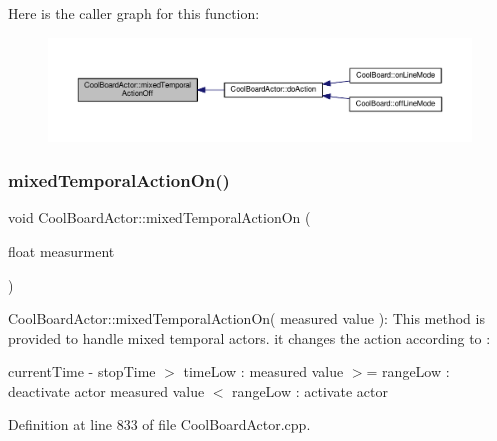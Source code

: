 Here is the caller graph for this function\+:\nopagebreak
\begin{figure}[H]
\begin{center}
\leavevmode
\includegraphics[width=350pt]{dc/d69/class_cool_board_actor_a00b29c4abf0388551aa6812372113cf1_icgraph}
\end{center}
\end{figure}
\mbox{\label{class_cool_board_actor_a216aa7a0cfd1f31d0025cc91c2ecd5dd}} 
\subsubsection{\texorpdfstring{mixed\+Temporal\+Action\+On()}{mixedTemporalActionOn()}}
{\footnotesize\ttfamily void Cool\+Board\+Actor\+::mixed\+Temporal\+Action\+On (\begin{DoxyParamCaption}\item[{float}]{measurment }\end{DoxyParamCaption})}

Cool\+Board\+Actor\+::mixed\+Temporal\+Action\+On( measured value )\+: This method is provided to handle mixed temporal actors. it changes the action according to \+:

current\+Time -\/ stop\+Time $>$ time\+Low \+: measured value $>$= range\+Low \+: deactivate actor measured value $<$ range\+Low \+: activate actor 

Definition at line 833 of file Cool\+Board\+Actor.\+cpp.


